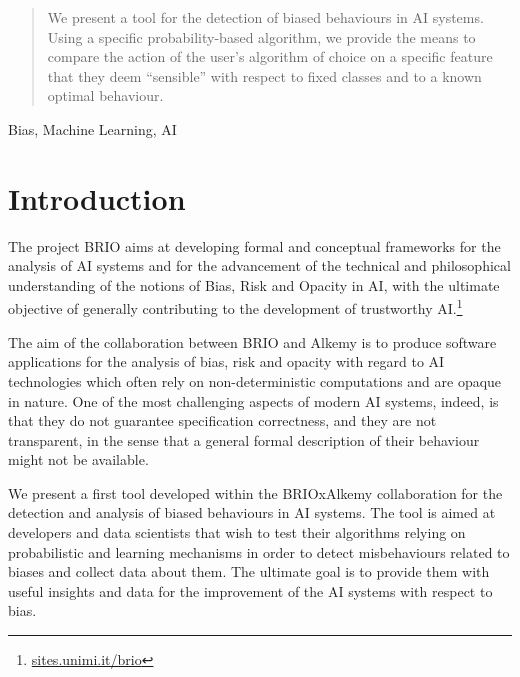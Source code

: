 \documentclass[
]{ceurart}
\begin{document}

\begin{abstract}
We present a tool for the detection of biased behaviours in AI systems. Using a specific probability-based algorithm,
we provide the means to compare the action of the user's algorithm of choice on a specific feature that they deem ``sensible'' with respect to fixed classes and to a known optimal behaviour.
\end{abstract}

\begin{keywords}
Bias, Machine Learning, AI
\end{keywords}

\maketitle

\section{Introduction}
\label{sec:intro}


The project BRIO aims at developing formal and conceptual frameworks for the analysis of AI systems and for the advancement of the technical and philosophical understanding of the notions of Bias, Risk and Opacity in AI, with the ultimate objective of generally contributing to the development of trustworthy AI.\footnote{\url{sites.unimi.it/brio}} 

The aim of the collaboration between BRIO and Alkemy is to produce software applications for the analysis of bias, risk and opacity with regard to AI technologies which often rely on non-deterministic computations and are opaque in nature. One of the most challenging aspects of modern AI systems, indeed, is that they do not guarantee specification correctness, and they are not transparent, in the sense that a general formal description of their behaviour might not be available.

We present a first tool developed within the BRIOxAlkemy collaboration for the detection and analysis of biased behaviours in AI systems. The tool is aimed at developers and data scientists that wish to test their algorithms relying on probabilistic and learning mechanisms in order to detect misbehaviours related to biases and collect data about them. The ultimate goal is to provide them with useful insights and data for the improvement of the AI systems with respect to bias.
\end{document}
